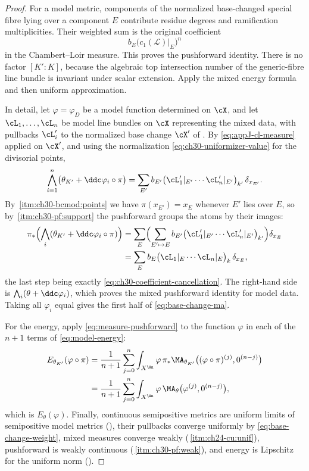 \begin{proof}
For a model metric, components of the normalized base-changed special fibre
lying over a component $E$ contribute residue degrees and ramification
multiplicities.  Their weighted sum is the original coefficient
\[
 b_E\bigl(c_1(\mathcal L)|_E\bigr)^n
\]
in the Chambert--Loir measure.  This proves the pushforward identity.  There
is no factor $[K':K]$, because the algebraic top intersection number of
the generic-fibre line bundle is invariant under scalar extension.  Apply
the mixed energy formula and then uniform approximation.

In detail, let $\varphi=\varphi_D$ be a model function determined on
$\cX$, and let $\cL_1,\ldots,\cL_n$ be model line bundles on $\cX$
representing the mixed data, with pullbacks $\cL'_i$ to the normalized
base change $\cX'$ of .  By
\eqref{eq:appJ-cl-measure} applied on $\cX'$, and using the normalization
\eqref{eq:ch30-uniformizer-value} for the divisorial points,
\[
 \bigwedge_{i=1}^n\bigl(\theta_{K'}+\ddc\varphi_i\circ\pi\bigr)
 =\sum_{E'}b_{E'}
   \bigl(\cL'_1|_{E'}\cdots\cL'_n|_{E'}\bigr)_{k'}\,\delta_{x_{E'}} .
\]
By \,\cref{itm:ch30-bcmod:points} we have
$\pi(x_{E'})=x_E$ whenever $E'$ lies over $E$, so by
\,\cref{itm:ch30-pf:support} the
pushforward groups the atoms by their images:
\[
\begin{aligned}
 \pi_*\Bigl(\bigwedge_i(\theta_{K'}+\ddc\varphi_i\circ\pi)\Bigr)
 &=\sum_E\Bigl(\sum_{E'\mapsto E}b_{E'}
    \bigl(\cL'_1|_{E'}\cdots\cL'_n|_{E'}\bigr)_{k'}\Bigr)\delta_{x_E}\\
 &=\sum_Eb_E\bigl(\cL_1|_E\cdots\cL_n|_E\bigr)_k\,\delta_{x_E},
\end{aligned}
\]
the last step being exactly
\eqref{eq:ch30-coefficient-cancellation}.  The right-hand side is
$\bigwedge_i(\theta+\ddc\varphi_i)$, which proves the mixed pushforward
identity for model data.  Taking all $\varphi_i$ equal gives the first
half of \eqref{eq:base-change-ma}.

For the energy, apply \eqref{eq:measure-pushforward} to the function
$\varphi$ in each of the $n+1$ terms of \eqref{eq:model-energy}:
\[
\begin{aligned}
 E_{\theta_{K'}}(\varphi\circ\pi)
 &=\frac1{n+1}\sum_{j=0}^n\int_{X^{\An}}\varphi\,
   \pi_*\MA_{\theta_{K'}}\bigl((\varphi\circ\pi)^{(j)},0^{(n-j)}\bigr)\\
 &=\frac1{n+1}\sum_{j=0}^n\int_{X^{\An}}\varphi\,
   \MA_\theta\bigl(\varphi^{(j)},0^{(n-j)}\bigr),
\end{aligned}
\]
which is $E_\theta(\varphi)$.  Finally, continuous semipositive metrics
are uniform limits of semipositive model metrics
(), their pullbacks converge uniformly by
\eqref{eq:base-change-weight}, mixed measures converge weakly
(\,\cref{itm:ch24-cu:unif}), pushforward
is weakly continuous
(\,\cref{itm:ch30-pf:weak}), and energy is
Lipschitz for the uniform norm ().
\end{proof}

